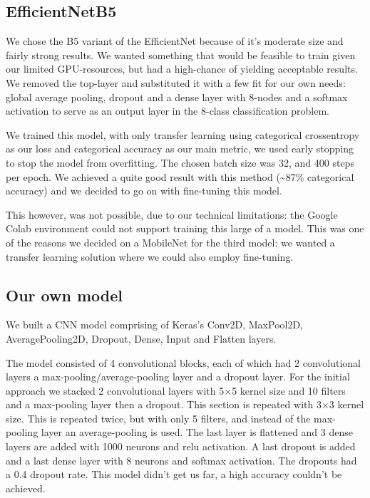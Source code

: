 \documentclass[twocolumn]{article}
\begin{document}
	\subsection{EfficientNetB5}
	
	We chose the B5 variant of the EfficientNet because of it's moderate size and fairly strong results. We wanted something that would be feasible to train given our limited GPU-resources, but had a high-chance of yielding acceptable results. We removed the top-layer and substituted it with a few fit for our own needs: global average pooling, dropout and a dense layer with 8-nodes and a softmax activation to serve as an output layer in the 8-class classification problem.
	
	We trained this model, with only transfer learning using categorical crossentropy as our loss and categorical accuracy as our main metric, we used early stopping to stop the model from overfitting. The chosen batch size was 32, and 400 steps per epoch. We achieved a quite good result with this method (\textasciitilde87\% categorical accuracy) and we decided to go on with fine-tuning this model. 
	
	This however, was not possible, due to our technical limitations: the Google Colab environment could not support training this large of a model. This was one of the reasons we decided on a MobileNet for the third model: we wanted a transfer learning solution where we could also employ fine-tuning. 
	
	\subsection{Our own model}
	We built a CNN model comprising of Keras's Conv2D, MaxPool2D, AveragePooling2D, Dropout, Dense, Input and Flatten layers.
	
	The model consisted of 4 convolutional blocks, each of which had 2 convolutional layers a max-pooling/average-pooling layer and a dropout layer.
	For the initial approach we stacked 2 convolutional layers with 5$\times$5 kernel size and 10 filters and a max-pooling layer then a dropout. This section is repeated with 3$\times$3 kernel size. This is repeated twice, but with only 5 filters, and instead of the max-pooling layer an average-pooling is used. The last layer is flattened and 3 dense layers are added with 1000 neurons and relu activation. A last dropout is added and a last dense layer with 8 neurons and softmax activation.
	The dropouts had a 0.4 dropout rate.
	This model didn't get us far, a high accuracy couldn't be achieved.
	
\end{document}

